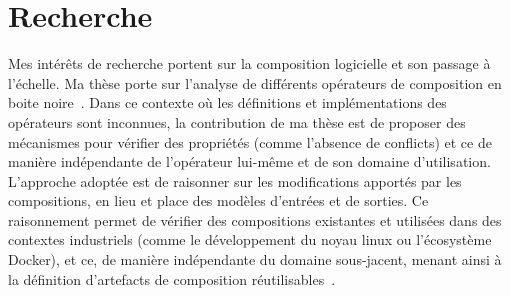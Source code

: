 \documentclass[11pt,a4paper,sans]{moderncv}        %
\begin{document}

\newpage
\section{Recherche}
Mes intérêts de recherche portent sur la composition logicielle et son passage à l'échelle. 
Ma thèse porte sur l'analyse de différents opérateurs de composition en boite noire~\cite{benni:hal-01659776,benni:hal-01722040}.
Dans ce contexte où les définitions et implémentations des opérateurs sont inconnues, la contribution de ma thèse est de proposer des mécanismes pour vérifier des propriétés (comme l'absence de conflicts) et ce de manière indépendante de l'opérateur lui-même et de son domaine d'utilisation. 
L'approche adoptée est de raisonner sur les modifications apportés par les compositions, en lieu et place des modèles d'entrées et de sorties.
Ce raisonnement permet de vérifier des compositions existantes et utilisées dans des contextes industriels (comme le développement du noyau linux ou l'écosystème Docker), et ce, de manière indépendante du domaine sous-jacent, menant ainsi à la définition d'artefacts de composition réutilisables~\cite{doi:10.1002/smr.2208}.
\end{document}
